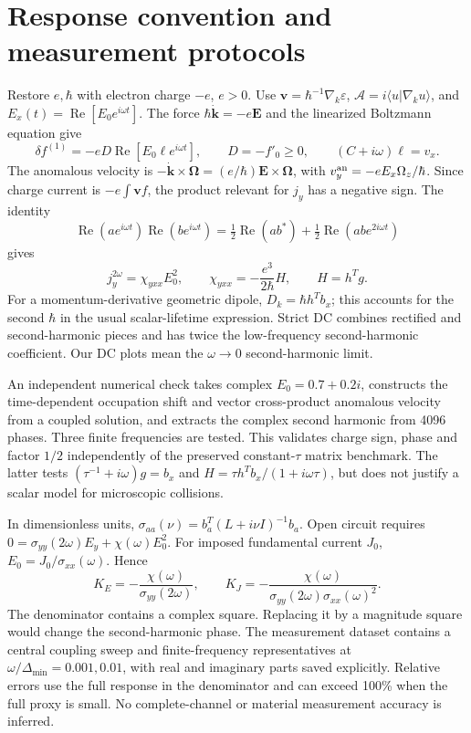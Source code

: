 \documentclass[11pt]{article}
\begin{document}
\section{Response convention and measurement protocols}
Restore $e,\hbar$ with electron charge $-e$, $e>0$. Use $\bm v=\hbar^{-1}\nabla_k\varepsilon$, $\bm{\mathcal A}=i\langle u|\nabla_ku\rangle$, and $E_x(t)=\operatorname{Re}[E_0e^{i\omega t}]$. The force $\hbar\dot{\bm k}=-e\bm E$ and the linearized Boltzmann equation give
\begin{equation}
\delta f^{(1)}=-eD\operatorname{Re}[E_0\ell e^{i\omega t}],\qquad
D=-f'_0\geq0,\qquad (C+i\omega)\ell=v_x.
\end{equation}
The anomalous velocity is $-\dot{\bm k}\times\bm\Omega=(e/\hbar)\bm E\times\bm\Omega$, with $v_y^{\rm an}=-eE_x\Omega_z/\hbar$. Since charge current is $-e\int\bm v f$, the product relevant for $j_y$ has a negative sign. The identity
\begin{equation}
\operatorname{Re}(ae^{i\omega t})\operatorname{Re}(be^{i\omega t})
=\tfrac12\operatorname{Re}(ab^*)+\tfrac12\operatorname{Re}(ab e^{2i\omega t})
\end{equation}
gives
\begin{equation}
j_y^{2\omega}=\chi_{yxx}E_0^2,\qquad
\chi_{yxx}=-\frac{e^3}{2\hbar}H,\qquad H=h^Tg.
\end{equation}
For a momentum-derivative geometric dipole, $D_k=\hbar h^Tb_x$; this accounts for the second $\hbar$ in the usual scalar-lifetime expression. Strict DC combines rectified and second-harmonic pieces and has twice the low-frequency second-harmonic coefficient. Our DC plots mean the $\omega\to0$ second-harmonic limit.

An independent numerical check takes complex $E_0=0.7+0.2i$, constructs the time-dependent occupation shift and vector cross-product anomalous velocity from a coupled solution, and extracts the complex second harmonic from 4096 phases. Three finite frequencies are tested. This validates charge sign, phase and factor $1/2$ independently of the preserved constant-$\tau$ matrix benchmark. The latter tests $(\tau^{-1}+i\omega)g=b_x$ and $H=\tau h^Tb_x/(1+i\omega\tau)$, but does not justify a scalar model for microscopic collisions.

In dimensionless units, $\sigma_{aa}(\nu)=b_a^T(L+i\nu I)^{-1}b_a$. Open circuit requires $0=\sigma_{yy}(2\omega)E_y+\chi(\omega)E_0^2$. For imposed fundamental current $J_0$, $E_0=J_0/\sigma_{xx}(\omega)$. Hence
\begin{equation}
K_E=-\frac{\chi(\omega)}{\sigma_{yy}(2\omega)},\qquad
K_J=-\frac{\chi(\omega)}{\sigma_{yy}(2\omega)\sigma_{xx}(\omega)^2}.
\end{equation}
The denominator contains a complex square. Replacing it by a magnitude square would change the second-harmonic phase. The measurement dataset contains a central coupling sweep and finite-frequency representatives at $\omega/\Delta_{\min}=0.001,0.01$, with real and imaginary parts saved explicitly. Relative errors use the full response in the denominator and can exceed 100\% when the full proxy is small. No complete-channel or material measurement accuracy is inferred.
\end{document}
